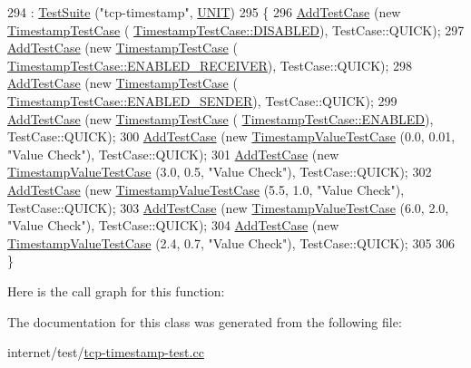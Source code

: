 \begin{DoxyCode}
294     : \hyperlink{classns3_1_1TestSuite_a904b0c40583b744d30908aeb94636d1a}{TestSuite} (\textcolor{stringliteral}{"tcp-timestamp"}, \hyperlink{classns3_1_1TestSuite_a1ebfcab34ec8161e085e8e3a1855eae0a3885375a3787abf60431f8454b3cadbd}{UNIT})
295   \{
296     \hyperlink{classns3_1_1TestCase_a3718088e3eefd5d6454569d2e0ddd835}{AddTestCase} (\textcolor{keyword}{new} \hyperlink{classTimestampTestCase}{TimestampTestCase} (
      \hyperlink{classTimestampTestCase_a98399735307f2da16757d48f88ebbd6aa7478101986b562387eea24a910632880}{TimestampTestCase::DISABLED}), TestCase::QUICK);
297     \hyperlink{classns3_1_1TestCase_a3718088e3eefd5d6454569d2e0ddd835}{AddTestCase} (\textcolor{keyword}{new} \hyperlink{classTimestampTestCase}{TimestampTestCase} (
      \hyperlink{classTimestampTestCase_a98399735307f2da16757d48f88ebbd6aab1676abdfe892d1578256cdc2095cb8a}{TimestampTestCase::ENABLED\_RECEIVER}), TestCase::QUICK);
298     \hyperlink{classns3_1_1TestCase_a3718088e3eefd5d6454569d2e0ddd835}{AddTestCase} (\textcolor{keyword}{new} \hyperlink{classTimestampTestCase}{TimestampTestCase} (
      \hyperlink{classTimestampTestCase_a98399735307f2da16757d48f88ebbd6aaea98c375a5153b8db5af79c408d95e50}{TimestampTestCase::ENABLED\_SENDER}), TestCase::QUICK);
299     \hyperlink{classns3_1_1TestCase_a3718088e3eefd5d6454569d2e0ddd835}{AddTestCase} (\textcolor{keyword}{new} \hyperlink{classTimestampTestCase}{TimestampTestCase} (
      \hyperlink{classTimestampTestCase_a98399735307f2da16757d48f88ebbd6aad00a02cea964b70034eb6324f29bb891}{TimestampTestCase::ENABLED}), TestCase::QUICK);
300     \hyperlink{classns3_1_1TestCase_a3718088e3eefd5d6454569d2e0ddd835}{AddTestCase} (\textcolor{keyword}{new} \hyperlink{classTimestampValueTestCase}{TimestampValueTestCase} (0.0, 0.01, \textcolor{stringliteral}{"Value Check"}), 
      TestCase::QUICK);
301     \hyperlink{classns3_1_1TestCase_a3718088e3eefd5d6454569d2e0ddd835}{AddTestCase} (\textcolor{keyword}{new} \hyperlink{classTimestampValueTestCase}{TimestampValueTestCase} (3.0, 0.5,  \textcolor{stringliteral}{"Value Check"}), 
      TestCase::QUICK);
302     \hyperlink{classns3_1_1TestCase_a3718088e3eefd5d6454569d2e0ddd835}{AddTestCase} (\textcolor{keyword}{new} \hyperlink{classTimestampValueTestCase}{TimestampValueTestCase} (5.5, 1.0,  \textcolor{stringliteral}{"Value Check"}), 
      TestCase::QUICK);
303     \hyperlink{classns3_1_1TestCase_a3718088e3eefd5d6454569d2e0ddd835}{AddTestCase} (\textcolor{keyword}{new} \hyperlink{classTimestampValueTestCase}{TimestampValueTestCase} (6.0, 2.0,  \textcolor{stringliteral}{"Value Check"}), 
      TestCase::QUICK);
304     \hyperlink{classns3_1_1TestCase_a3718088e3eefd5d6454569d2e0ddd835}{AddTestCase} (\textcolor{keyword}{new} \hyperlink{classTimestampValueTestCase}{TimestampValueTestCase} (2.4, 0.7,  \textcolor{stringliteral}{"Value Check"}), 
      TestCase::QUICK);
305 
306   \}
\end{DoxyCode}


Here is the call graph for this function\+:




The documentation for this class was generated from the following file\+:\begin{DoxyCompactItemize}
\item 
internet/test/\hyperlink{tcp-timestamp-test_8cc}{tcp-\/timestamp-\/test.\+cc}\end{DoxyCompactItemize}
